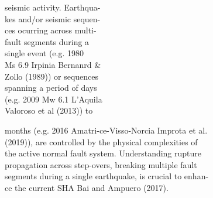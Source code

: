 \begin{poster}
{\begin{minipage}{0.48\linewidth}
{\begin{spacing}{1.0}
 seismic activity. Earthqua-\\
 kes and/or seismic sequen-\\
 ces ocurring across multi-\\
 fault segments during a \\
 single event (e.g. 1980 \\
 Ms 6.9 Irpinia Bernanrd \&\\
 Zollo (1989)) or sequences\\
 spanning a period of days \\
 (e.g. 2009 Mw 6.1 L’Aquila \\
 Valoroso et al (2013)) to
\end{spacing}
 }
\end{minipage}
\vskip -0.3cm{\small  months (e.g. 2016 Amatri-ce-Visso-Norcia Improta et al.\\ (2019)), are controlled by the physical complexities of \\
the active normal fault system. Understanding rupture \\
propagation across step-overs, breaking multiple fault\\
segments during a single earthquake, is crucial to enhan-\\
ce the current SHA Bai and Ampuero (2017).} \\ \nocite{Bai_2017_ESD}
\vskip -0.2cm
    \vskip -0.2cm
}


\end{poster}
